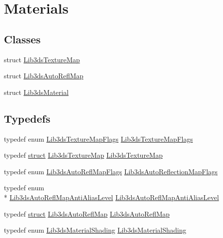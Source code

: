 \hypertarget{group__material}{\section{Materials}
\label{group__material}
}
\subsection*{Classes}
\begin{DoxyCompactItemize}
\item 
struct \hyperlink{struct_lib3ds_texture_map}{Lib3ds\-Texture\-Map}
\item 
struct \hyperlink{struct_lib3ds_auto_refl_map}{Lib3ds\-Auto\-Refl\-Map}
\item 
struct \hyperlink{struct_lib3ds_material}{Lib3ds\-Material}
\end{DoxyCompactItemize}
\subsection*{Typedefs}
\begin{DoxyCompactItemize}
\item 
typedef enum \hyperlink{group__material_ga2ae5527c7d5eab53e2cd3e1357021f96}{Lib3ds\-Texture\-Map\-Flags} \hyperlink{group__material_gad60b47978e75464a27e6663c5f1af58b}{Lib3ds\-Texture\-Map\-Flags}
\item 
typedef \hyperlink{sdlgamepad_8dox_aba655c5729da86df745f0c8e7f9ba8d2}{struct} \hyperlink{struct_lib3ds_texture_map}{Lib3ds\-Texture\-Map} \hyperlink{group__material_gaf0e1d247b09e9323833e378665035611}{Lib3ds\-Texture\-Map}
\item 
typedef enum \hyperlink{group__material_ga27e0cbd4c9ed8324d7ec096c22cf5403}{Lib3ds\-Auto\-Refl\-Map\-Flags} \hyperlink{group__material_gabe0747056dcdc0983db5e31e4b9c08ce}{Lib3ds\-Auto\-Reflection\-Map\-Flags}
\item 
typedef enum \\*
\hyperlink{group__material_ga327a395fb4dcac3a72fffec5bb424634}{Lib3ds\-Auto\-Refl\-Map\-Anti\-Alias\-Level} \hyperlink{group__material_ga0a1dda34b42ffa956d04980b01d30be7}{Lib3ds\-Auto\-Refl\-Map\-Anti\-Alias\-Level}
\item 
typedef \hyperlink{sdlgamepad_8dox_aba655c5729da86df745f0c8e7f9ba8d2}{struct} \hyperlink{struct_lib3ds_auto_refl_map}{Lib3ds\-Auto\-Refl\-Map} \hyperlink{group__material_ga94f3cb70730d4ac53973512d04f74905}{Lib3ds\-Auto\-Refl\-Map}
\item 
typedef enum \hyperlink{group__material_ga02f664edc07cb3d0c34ca56639099cf8}{Lib3ds\-Material\-Shading} \hyperlink{group__material_gaca1388400cc0dec5fe679457cd861686}{Lib3ds\-Material\-Shading}
\end{DoxyCompactItemize}
